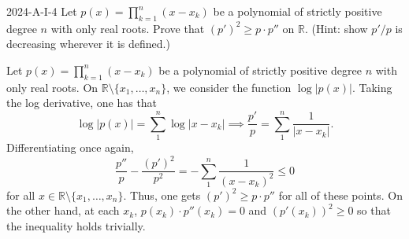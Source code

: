 \documentclass{article}
\begin{document}
	\begin{prb}{2024-A-I-4}
		Let $p(x) = \prod_{k = 1}^{n}(x - x_{k})$ be a polynomial of strictly positive degree $n$ with only real roots. Prove that $(p')^2 \geq p \cdot p''$ on $\mathbb{R}$. (Hint: show $p'/p$ is decreasing wherever it is defined.)
	\end{prb}
	Let $p(x) = \prod_{k= 1}^{n}(x - x_{k})$ be a polynomial of strictly positive degree $n$ with only real roots. On $\mathbb{R}\setminus \{x_{1}, \ldots, x_{n}\}$, we consider the function $\log|p(x)|$. Taking the log derivative, one has that 
	\begin{equation*}
		\log|p(x)| =\sum_{1}^{n}\log|x - x_{k}| \implies \frac{p'}{p} = \sum_{1}^{n}\frac{1}{|x - x_{k}|}. 
	\end{equation*}
	Differentiating once again, 
	\begin{equation*}
		\frac{p''}{p} - \frac{(p')^{2}}{p^2} = -\sum_{1}^{n}\frac{1}{(x - x_k)^2} \leq 0
	\end{equation*} 
	for all $x \in \mathbb{R}\setminus \{x_1, \ldots, x_n\}$. Thus, one gets $(p')^2 \geq p \cdot p''$ for all of these points. On the other hand, at each $x_k$, $p(x_k) \cdot p''(x_k) = 0$ and $(p'(x_k))^2 \geq 0$ so that the inequality holds trivially. 
	
\end{document}
